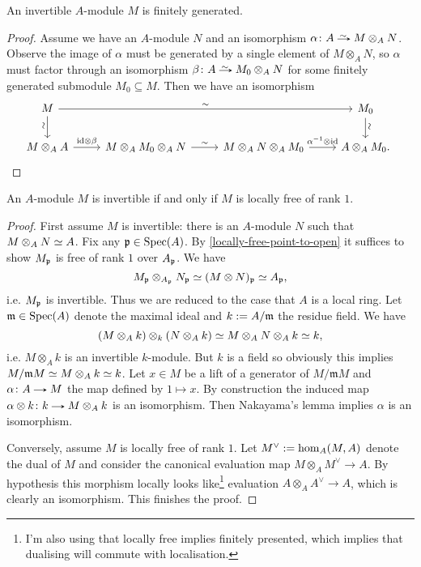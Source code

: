 \begin{lemma}
  \label{invertible-module-finitely-generated}
  An invertible $A$-module $M$ is finitely generated.
\end{lemma}

\begin{proof}
  Assume we have an $A$-module $N$ and an isomorphism $\alpha \c A
  \isoto M \otimes_A N$. Observe the image of $\alpha$ must be
  generated by a single element of $M \otimes_A N$, so $\alpha$ must
  factor through an isomorphism $\beta \c A \isoto M_0 \otimes_A N$
  for some finitely generated submodule $M_0 \subseteq M$. Then we
  have an isomorphism
  \[
  \hspace{-4pt}
  \begin{tikzcd}
    M \ar[d, "\sim"{rotate=90, yshift=3pt, xshift=-4pt}] \ar[rrr,
    "\sim"] & & & M_0 \ar[d, "\sim"{rotate=90, yshift=-4pt,
      xshift=-4pt}] \\ M \otimes_A A \ar[r, "\id \otimes \beta"] & M
    \otimes_A M_0 \otimes_A N \ar[r, "\sim"] & M \otimes_A N \otimes_A
    M_0 \ar[r, "\alpha^{-1} \otimes \id"] & A \otimes_A M_0.
  \end{tikzcd}
  \qedhere
  \]
\end{proof}

\begin{lemma}
  \label{invertible-locally-free}
  An $A$-module $M$ is invertible if and only if $M$ is locally free
  of rank $1$.
\end{lemma}

\newcommand{\m}{\mathfrak{m}}
\begin{proof}
  First assume $M$ is invertible: there is an $A$-module $N$ such that
  $M \otimes_A N \simeq A$. Fix any $\mathfrak{p} \in \operatorname{Spec}(A)$. By
  \eqref{locally-free-point-to-open} it suffices to show $M_{\mathfrak{p}}$ is free
  of rank $1$ over $A_{\mathfrak{p}}$. We have
  \[
  M_{\mathfrak{p}} \otimes_{A_{\mathfrak{p}}} N_{\mathfrak{p}} \simeq (M \otimes N)_{\mathfrak{p}} \simeq A_{\mathfrak{p}},
  \]
  i.e. $M_{\mathfrak{p}}$ is invertible. Thus we are reduced to the case that $A$
  is a local ring. Let $\m \in \Spec(A)$ denote the maximal ideal and
  $k \ce A/\m$ the residue field. We have
  \[
  (M \otimes_A k) \otimes_k (N \otimes_A k) \simeq M \otimes_A N
  \otimes_A k \simeq k,
  \]
  i.e. $M \otimes_A k$ is an invertible $k$-module. But $k$ is a field
  so obviously this implies $M/\m M \iso M \otimes_A k \iso k$. Let $x
  \in M$ be a lift of a generator of $M/\m M$ and $\alpha \c A \to M$
  the map defined by $1 \mapsto x$. By construction the induced map
  $\alpha \otimes k \c k \to M \otimes_A k$ is an isomorphism.  Then
  Nakayama's lemma implies $\alpha$ is an isomorphism.

  Conversely, assume $M$ is locally free of rank $1$. Let $M^\vee \mathrel{:=}
  \hom_A(M, A)$ denote the dual of $M$ and consider the canonical
  evaluation map $M \otimes_A M^\vee \to A$. By hypothesis this
  morphism locally looks like\footnote{I'm also using that locally
    free implies finitely presented, which implies that dualising will
    commute with localisation.} evaluation $A \otimes_A A^\vee \to A$,
  which is clearly an isomorphism. This finishes the proof.
\end{proof}

